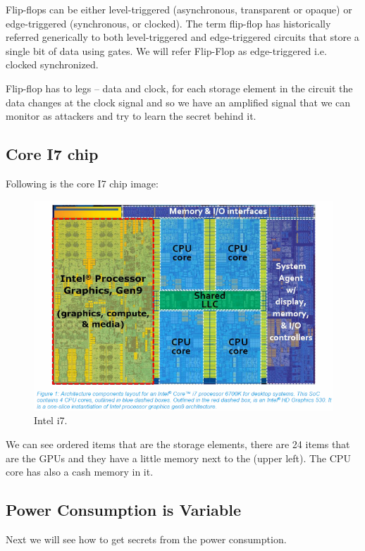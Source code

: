 Flip-flops can be either level-triggered (asynchronous, transparent or opaque) or edge-triggered (synchronous, or clocked). The term flip-flop has historically referred generically to both level-triggered and edge-triggered circuits that store a single bit of data using gates. We will refer Flip-Flop as edge-triggered i.e. clocked synchronized.

Flip-flop has to legs – data and clock, for each storage element in the circuit the data changes at the clock signal and so we have an amplified signal that we can monitor as attackers and try to learn the secret behind it.

 \subsection { Core I7 chip }
 
Following is the core I7 chip image:

\begin{figure}[!ht]
	\centering
	\includegraphics{images/i7.png}
	\caption{Intel i7.} \label{fig:i7}
\end{figure}

We can see ordered items that are the storage elements, there are 24 items that are the GPUs and they have a little memory next to the (upper left). The CPU core has also a cash memory in it.

\subsection { Power Consumption is Variable }

Next we will see how to get secrets from the power consumption.

